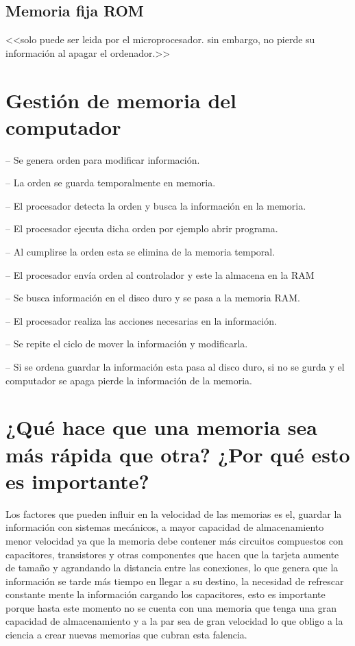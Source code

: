 \documentclass{article}
\begin{document}
\subsection{Memoria fija ROM  }
<<solo puede ser leida por el microprocesador. sin embargo, no pierde su información al apagar el ordenador.>> \cite{transistores}


\section{Gestión de memoria del computador}


-- Se genera orden para modificar información.

-- La orden se guarda temporalmente en memoria.

-- El procesador detecta la orden y busca la información en la memoria. 

-- El procesador ejecuta dicha orden por ejemplo abrir programa. 

-- Al cumplirse la orden esta se elimina de la memoria temporal.

-- El procesador envía orden al controlador y este la almacena en la RAM

-- Se busca información en el disco duro y se pasa a la memoria RAM.

-- El procesador realiza las acciones necesarias en la información. 

-- Se repite el ciclo de mover la información y modificarla. 

-- Si se ordena guardar la información esta pasa al disco duro, si no se gurda y el computador se apaga pierde la información de la memoria.\cite{computadores}


\section{¿Qué hace que una memoria sea más rápida que otra? ¿Por qué esto es importante?}

Los factores que pueden influir en la velocidad de las memorias es el, guardar la información con sistemas mecánicos, a mayor capacidad de almacenamiento menor velocidad ya que la memoria debe contener más circuitos compuestos con capacitores, transistores y otras componentes que hacen que la tarjeta aumente de tamaño y agrandando   la distancia entre las conexiones, lo que genera que la información se tarde más tiempo en llegar a su destino, la necesidad de refrescar constante mente la información cargando los capacitores, esto es importante porque hasta este momento no se cuenta con una memoria que tenga una gran capacidad de almacenamiento y a la par sea de gran velocidad lo que obligo a la ciencia a crear nuevas memorias que cubran esta falencia. 
\end{document}
